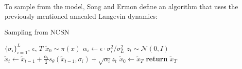 \documentclass[twoside]{article}
\numberwithin{equation}{section}
\numberwithin{figure}{section}
\begin{document}
\\\\
To sample from the model, Song and Ermon \cite{song2020generative} define an algorithm that uses the previously mentioned annealed Langevin dynamics:
\begin{algorithm}[H]
  \centering
  \caption{Sampling from NCSN}\label{alg:ncsn}
  \begin{algorithmic}[1]
    \Require $\{\sigma_i\}_{i=1}^L$, $\epsilon$, $T$ 
    \State $\tilde{x}_0 \sim \pi(x)$
      \State $\alpha_i \leftarrow \epsilon \cdot \sigma_i^2 / \sigma_L^2$
        \State $z_t \sim \mathcal{N}(0, I)$
        \State $\tilde{x}_t \leftarrow \tilde{x}_{t-1} + \frac{\alpha_i}{2} s_\theta (\tilde{x}_{t-1}, \sigma_i) + \sqrt{\alpha_i} z_t$
      \EndFor
      \State $\tilde{x}_0 \leftarrow \tilde{x}_T$
    \EndFor
    \State \textbf{return} $\tilde{x}_T$
  \end{algorithmic}
\end{algorithm}
\end{document}
